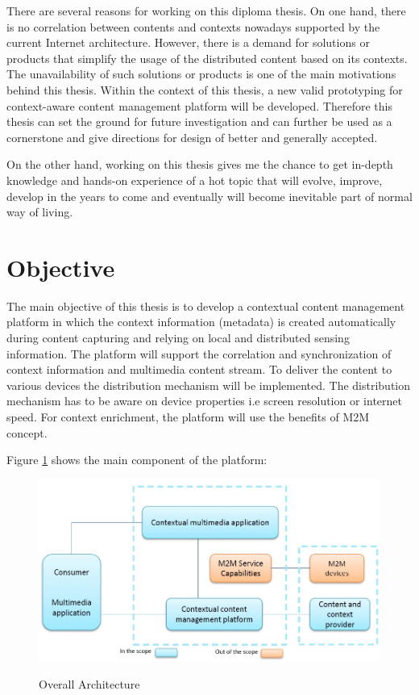 There are several reasons for working on this diploma thesis. On one hand, there is no correlation between contents and contexts nowadays supported by the current Internet architecture. However, there is a demand for solutions or products that simplify the usage of the distributed content based on its contexts. The unavailability of such solutions or products is one of the main motivations behind this thesis. Within the context of this thesis, a new valid prototyping for context-aware content management platform will be developed. Therefore this thesis can set the ground for future investigation and can further be used as a cornerstone and give directions for design of better and generally accepted.

On the other hand, working on this thesis gives me the chance to get in-depth knowledge and hands-on experience of a hot topic that will evolve, improve, develop in the years to come and eventually will become inevitable part of normal way of living.

\section{Objective\label{sec:objective}}

The main objective of this thesis is to develop a contextual content management platform in which the context information (metadata) is created automatically during content capturing and relying on local and distributed sensing information. The platform will support the correlation and synchronization of context information and multimedia content stream. To deliver the content to various devices the distribution mechanism will be implemented. The distribution mechanism has to be aware on device properties i.e screen resolution or internet speed. For context enrichment, the platform will use the benefits of M2M concept.

Figure \ref{fig:oarch} shows the main component of the platform:
\begin{figure}[htb]
  \centering
  \includegraphics[scale=0.5]{DA-OverallArchitecture.jpg}\\
  \caption{Overall Architecture}
  \label{fig:oarch}
\end{figure}


